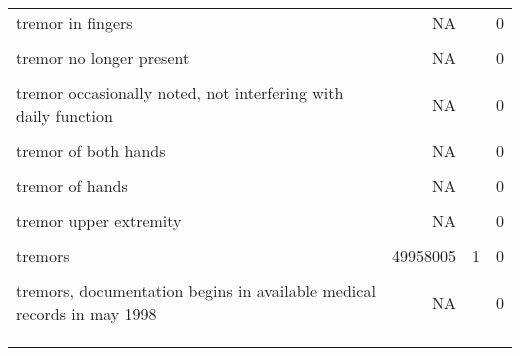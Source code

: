 \documentclass[10pt, letterpaper]{article}
\begin{document}
\begin{spacing}{1.0}
\begin{footnotesize}
\begin{longtable}[H]{p{4in}rrr}
        tremor in fingers & NA &  & 0\\
        & & &\\[-6pt]
        tremor no longer present & NA &  & 0\\
        & & &\\[-6pt]
        tremor occasionally noted, not interfering with daily function & NA &  & 0\\
        & & &\\[-6pt]
        tremor of both hands & NA &  & 0\\
        & & &\\[-6pt]
        tremor of hands & NA &  & 0\\
        & & &\\[-6pt]
        tremor upper extremity & NA &  & 0\\
        & & &\\[-6pt]
        tremors & 49958005 & 1 & 0\\
        & & &\\[-6pt]
        tremors, documentation begins in available medical records in may 1998 & NA &  & 0\\
        & & &\\[-6pt]
        \hline\\[-6pt]
        \label{tab:res3}
    \end{longtable}
\end{footnotesize}

\end{spacing}
\end{document}
